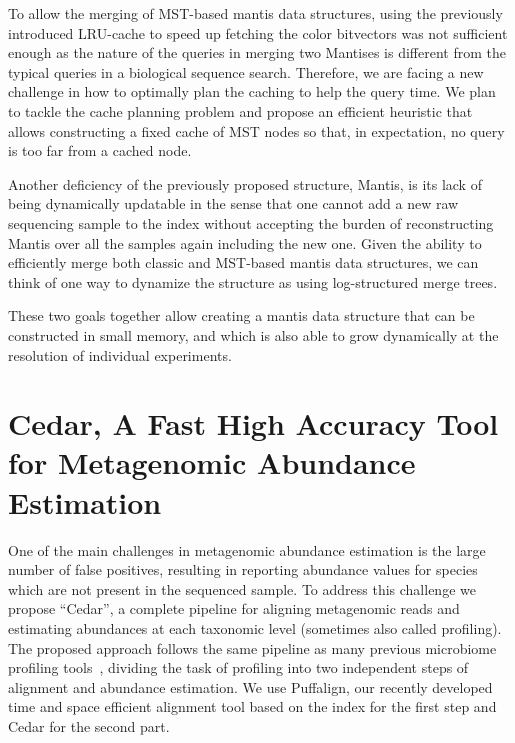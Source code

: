 To allow the merging of MST-based mantis data structures,
using the previously introduced LRU-cache to speed up fetching the color bitvectors
was not sufficient enough as the nature of the queries in merging two Mantises
is different from the typical queries in a biological sequence search.
Therefore, we are facing a new challenge in how to optimally plan the caching
to help the query time. We plan to tackle the cache planning problem and
propose an efficient heuristic that allows constructing a fixed cache of MST nodes
so that, in expectation, no query is too far from a cached node.

Another deficiency of the previously proposed structure, Mantis,
is its lack of being dynamically updatable in the sense that one cannot
add a new raw sequencing sample to the index without accepting the burden of
reconstructing Mantis over all the samples again including the new one.
Given the ability to efficiently merge both classic and MST-based mantis data structures,
we can think of one way to dynamize the structure as using log-structured merge trees.

These two goals together allow creating a mantis data structure that can be constructed in small memory,
and which is also able to grow dynamically at the resolution of individual experiments.


\section{Cedar, A Fast High Accuracy Tool for Metagenomic Abundance Estimation}
One of the main challenges in metagenomic abundance estimation is the large number of
false positives, resulting in reporting abundance values for species
which are not present in the sequenced sample.
To address this challenge we propose ``Cedar'',
a complete pipeline for aligning metagenomic reads and estimating abundances
at each taxonomic level (sometimes also called profiling).
The proposed approach follows the same pipeline as many previous microbiome profiling
tools~\cite{huson2011integrative, lindner2012metagenomic,fischer2017abundance,lu2017bracken},
dividing the task of profiling into two independent steps of alignment and abundance estimation.
We use Puffalign, our recently developed time and space efficient alignment tool
based on the \pufferfish index for the first step and Cedar for the second part.

